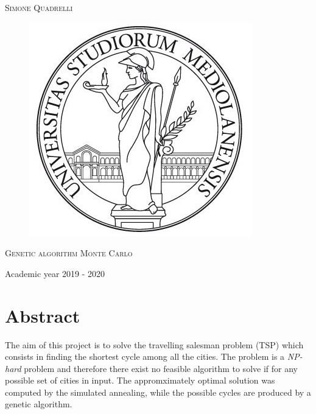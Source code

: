 \documentclass{article}
\begin{document}
\begin{titlepage}
	
	
	\begin{center}
		\vspace{2 cm}
		{\Large \textsc{Simone Quadrelli} }
	\end{center}
	
	
	\begin{figure}[H]
		\vspace{2 cm}
		\centering
		\includegraphics[width=0.30\linewidth]{tesiSCIENZE_TECNOLOGIE.jpg}
		
	\end{figure}
	
	\begin{center}
		\vspace{2 cm}
		{\Large \textsc{Genetic algorithm Monte Carlo} }
	\end{center}

	\par
	\vspace{3 cm}
	
	\begin{center}
		{\large Academic year 2019 - 2020}
	\end{center}
\end{titlepage}

\newpage 
{}
\tableofcontents
\listoftables
\listoffigures
\newpage


\section*{Abstract}
The aim of this project is to solve the travelling salesman problem (TSP) which consists in finding the shortest cycle among all the cities. The problem is a \textit{NP-hard} problem and therefore there exist no feasible algorithm to solve if for any possible set of cities in input. The appromximately optimal solution was computed by the simulated annealing, while the possible cycles are produced by a genetic algorithm.
\end{document}

